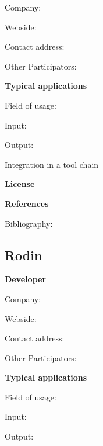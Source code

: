\documentclass{./template/openetcs_report}
\begin{document}
	Company: 

	Webside:

	Contact address:

	Other  Participators:



	\textbf{Typical applications}

	Field of usage:


	Input:

	Output:





	Integration in a tool chain



	\textbf{License}


	\textbf{References}

	Bibliography:

\subsection{Rodin}

	\textbf{Developer}

	Company: 

	Webside:

	Contact address:

	Other  Participators:



	\textbf{Typical applications}

	Field of usage:


	Input:

	Output:


\end{document}
